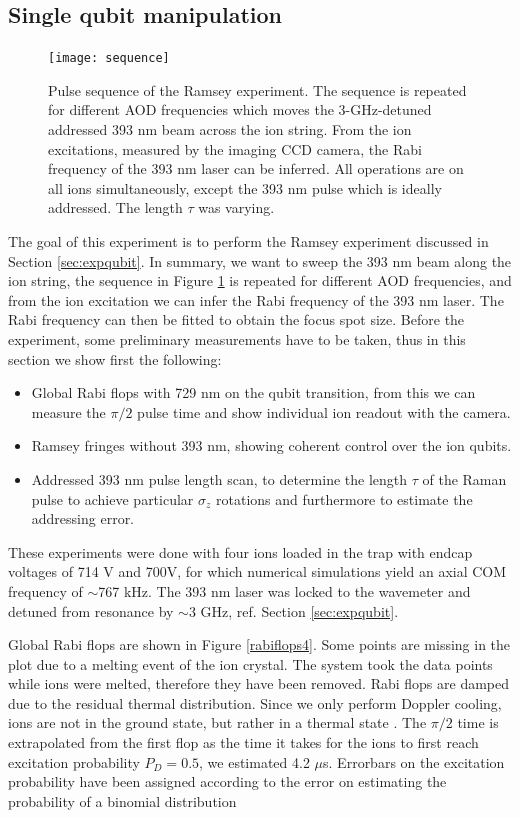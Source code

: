 \subsection{Single qubit manipulation}
\label{sec:singlequbitmanipulation}
\begin{figure}[H]
\centering
\texttt{[image: sequence]}
\caption{Pulse sequence of the Ramsey experiment. The sequence is repeated for different AOD frequencies which moves the 3-GHz-detuned addressed 393 nm beam across the ion string. From the ion excitations, measured by the imaging CCD camera, the Rabi frequency of the 393 nm laser can be inferred. All operations are on all ions simultaneously, except the 393 nm pulse which is ideally addressed. The length $\tau$ was varying.}
\label{sequence}
\end{figure}
The goal of this experiment is to perform the Ramsey experiment discussed in Section \ref{sec:expqubit}. In summary, we want to sweep the 393 nm beam along the ion string, the sequence in Figure \ref{sequence} is repeated for different AOD frequencies, and from the ion excitation we can infer the Rabi frequency of the 393 nm laser. The Rabi frequency can then be fitted to obtain the focus spot size. Before the experiment, some preliminary measurements have to be taken, thus in this section we show first the following:
\noindent\begin{itemize}
\item Global Rabi flops with 729 nm on the qubit transition, from this we can measure the $\pi/2$ pulse time and show individual ion readout with the camera.
\item Ramsey fringes without 393 nm, showing coherent control over the ion qubits.
\item Addressed 393 nm pulse length scan, to determine the length $\tau$ of the Raman pulse to achieve particular $\sigma_z$ rotations and furthermore to estimate the addressing error.
\end{itemize}
These experiments were done with four ions loaded in the trap with endcap voltages of 714 V and 700V, for which numerical simulations yield an axial COM frequency of $\sim$767 kHz. The 393 nm laser was locked to the wavemeter and detuned from resonance by $\sim$3 GHz, ref. Section \ref{sec:expqubit}.\par
Global Rabi flops are shown in Figure \ref{rabiflops4}. Some points are missing in the plot due to a melting event of the ion crystal. The system took the data points while ions were melted, therefore they have been removed. Rabi flops are damped due to the residual thermal distribution. Since we only perform Doppler cooling, ions are not in the ground state, but rather in a thermal state \cite{ross}. The $\pi/2$ time is extrapolated from the first flop as the time it takes for the ions to first reach excitation probability $P_D = 0.5$, we estimated 4.2 $\mu$s. Errorbars on the excitation probability have been assigned according to the error on estimating the probability of a binomial distribution \cite{mle}
